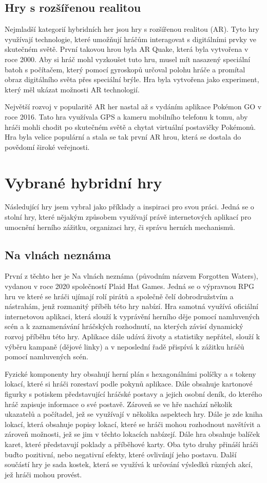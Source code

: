 \subsection{Hry s rozšířenou realitou}
Nejmladší kategorií hybridních her jsou hry s rozšířenou realitou (AR). Tyto hry využívají technologie, které umožňují hráčům interagovat s digitálními prvky ve skutečném světě. První takovou hrou byla AR Quake, která byla vytvořena v roce 2000. Aby si hráč mohl vyzkoušet tuto hru, musel mít nasazený speciální batoh s počítačem, který pomocí gyroskopů určoval polohu hráče a promítal obraz digitálního světa přes speciální brýle. Hra byla vytvořena jako experiment, který měl ukázat možnosti AR technologií.\cite{ar_history}

Největší rozvoj v popularitě AR her nastal až s vydáním aplikace Pokémon GO v roce 2016. Tato hra využívala GPS a kameru mobilního telefonu k tomu, aby hráči mohli chodit po skutečném světě a chytat virtuální postavičky Pokémonů. Hra byla velice populární a stala se tak první AR hrou, která se dostala do povědomí široké veřejnosti.

\section{Vybrané hybridní hry}
Následující hry jsem vybral jako příklady a inspiraci pro svou práci. Jedná se o stolní hry, které nějakým způsobem využívají právě internetových aplikací pro umocnění herního zážitku, organizaci hry, či správu herních mechanismů.

\subsection{Na vlnách neznáma}
První z těchto her je Na vlnách neznáma (původním názvem Forgotten Waters), vydanou v roce 2020 společností Plaid Hat Games. Jedná se o výpravnou RPG hru ve které se hráči ujímají rolí pirátů a společně čelí dobrodružstvím a nástrahám, jenž rozmanitý příběh této hry nabízí. Hra samotná využívá oficiální internetovou aplikaci\cite{forgotten_waters_app}, která slouží k vyprávění herního děje pomocí namluvených scén a k zaznamenávání hráčských rozhodnutí, na kterých závisí dynamický rozvoj příběhu této hry. Aplikace dále udává životy a statistiky nepřátel, slouží k výběru kampaně (dějové linky) a v neposlední řadě přispívá k zážitku hráčů pomocí namluvených scén.

Fyzické komponenty hry obsahují herní plán s hexagonálními políčky a s tokeny lokací, které si hráči rozestaví podle pokynů aplikace. Dále obsahuje kartonové figurky s potiskem představující hráčské postavy a jejich osobní deník, do kterého hráč zapisuje informace o své postavě. Zároveň se ve hře nachází několik ukazatelů a počítadel, jež se využívají v několika aspektech hry. Dále je zde kniha lokací, která obsahuje popisy lokací, které se hráči mohou rozhodnout navštívit a zároveň možnosti, jež se jim v těchto lokacích nabízejí. Dále hra obsahuje balíček karet, které představují poklady a příběhové karty. Oba tyto druhy přináší hráči buďto pozitivní, nebo negativní efekty, které ovlivňují jeho postavu. Další součástí hry je sada kostek, která se využívá k určování výsledků různých akcí, jež hráči mohou provést.

